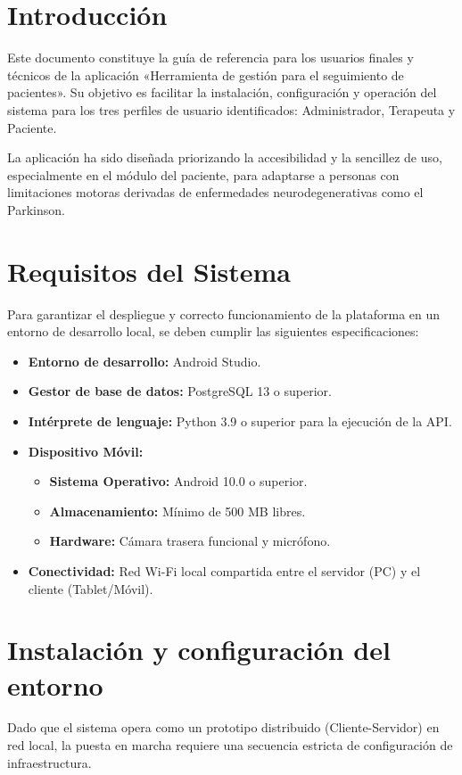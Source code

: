 \label{apendice:E}

\section{Introducción}
Este documento constituye la guía de referencia para los usuarios finales y técnicos de la aplicación «Herramienta de gestión para el seguimiento de pacientes». Su objetivo es facilitar la instalación, configuración y operación del sistema para los tres perfiles de usuario identificados: Administrador, Terapeuta y Paciente.

La aplicación ha sido diseñada priorizando la accesibilidad y la sencillez de uso, especialmente en el módulo del paciente, para adaptarse a personas con limitaciones motoras derivadas de enfermedades neurodegenerativas como el Parkinson.

\section{Requisitos del Sistema}
Para garantizar el despliegue y correcto funcionamiento de la plataforma en un entorno de desarrollo local, se deben cumplir las siguientes especificaciones:

\begin{itemize}
    \item \textbf{Entorno de desarrollo:} Android Studio.
    \item \textbf{Gestor de base de datos:} PostgreSQL 13 o superior.
    \item \textbf{Intérprete de lenguaje:} Python 3.9 o superior para la ejecución de la API.
    \item \textbf{Dispositivo Móvil:}
    \begin{itemize}
        \item \textbf{Sistema Operativo:} Android 10.0 o superior.
        \item \textbf{Almacenamiento:} Mínimo de 500 MB libres.
        \item \textbf{Hardware:} Cámara trasera funcional y micrófono.
    \end{itemize}
    \item \textbf{Conectividad:} Red Wi-Fi local compartida entre el servidor (PC) y el cliente (Tablet/Móvil).
\end{itemize}

\section{Instalación y configuración del entorno}
Dado que el sistema opera como un prototipo distribuido (Cliente-Servidor) en red local, la puesta en marcha requiere una secuencia estricta de configuración de infraestructura.

